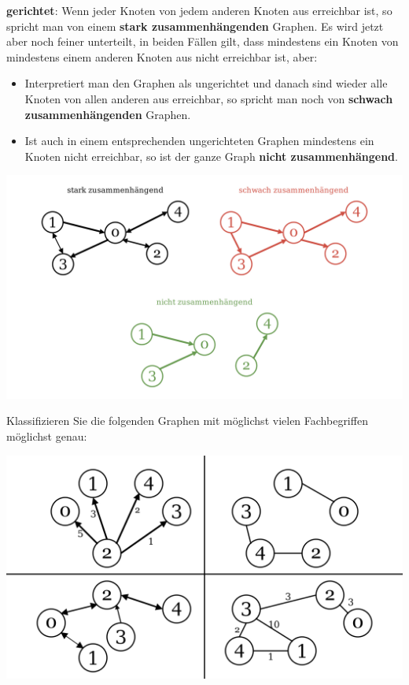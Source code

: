 \documentclass{article}
\begin{document}
\begin{enumerate}
\begin{center}
    \end{center}
    \textbf{gerichtet}: Wenn jeder Knoten von jedem anderen Knoten aus erreichbar ist, so spricht man von einem \textbf{stark zusammenhängenden} Graphen. Es wird jetzt aber noch feiner unterteilt, in beiden Fällen gilt, dass mindestens ein Knoten von mindestens einem anderen Knoten aus nicht erreichbar ist, aber:
    \begin{itemize}
        \item Interpretiert man den Graphen als ungerichtet und danach sind wieder alle Knoten von allen anderen aus erreichbar, so spricht man noch von \textbf{schwach zusammenhängenden} Graphen. 
        \item Ist auch in einem entsprechenden ungerichteten Graphen mindestens ein Knoten nicht erreichbar, so ist der ganze Graph \textbf{nicht zusammenhängend}.
    \end{itemize}
    \begin{center}
        \includegraphics[scale=0.15]{../media/gerichtet_zusammenhang.png}
    \end{center}
\end{enumerate}

\begin{task}{1}
    Klassifizieren Sie die folgenden Graphen mit möglichst vielen Fachbegriffen möglichst genau:
    \begin{center}
        \includegraphics[scale=0.2]{../media/graphs_task.png}
    \end{center}
\end{task}
\end{document}
